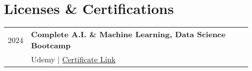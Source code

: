 \documentclass[]{deedy-resume-openfont}
\begin{document}
\begin{minipage}[t]{0.66\textwidth}
    \section{Licenses \& Certifications} 
    \begin{tabular}{rp{8cm}}
        2024 & \textbf{Complete A.I. \& Machine Learning, Data Science Bootcamp} \\
            & Udemy | \href{https://www.udemy.com/certificate/UC-3cbee6e1-4004-4ce4-8835-d999077730fc/}{Certificate Link} \\
        \end{tabular}
    \sectionsep


    \end{minipage} 
    
\end{document}
